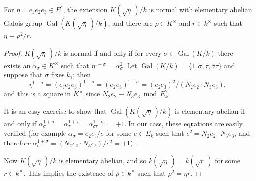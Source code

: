 \documentclass[10pt,a4paper]{amsart}
\newcommand{\Gal}{\operatorname{Gal}}
\begin{document}
\begin{lemma}\label{L2.9}
For $\eta = e_1e_2e_3 \in E^*$, the extension
$K(\sqrt{\eta}\,)/k$ is normal with elementary abelian
Galois group $\Gal(K(\sqrt{\eta}\,)/k)$, and there are
$\rho \in K^\times$ and $r \in k^\times$ such that
$\eta = \rho^2/r$.
\end{lemma}

\begin{proof}
$K(\sqrt{\eta}\,)/k$ is normal if and only if for every
$\sigma \in \Gal(K/k)$ there exists an $\alpha_\sigma \in K^\times$
such that $\eta^{1-\sigma} = \alpha_\sigma^2$. Let
$\Gal(K/k) = \{1,\sigma, \tau, \sigma\tau\}$ and suppose
that $\sigma$ fixes $k_1$; then
$$ \eta^{1-\sigma} = (e_1e_2e_3)^{1-\sigma}
   = (e_2e_3)^{1-\sigma} = (e_2e_3)^2/(N_2e_2 \cdot N_3e_3),$$
and this is a square in $K^\times$ since
$N_2e_2 \equiv N_3e_3 \bmod E_k^2$.

It is an easy exercise to show that $\Gal(K(\sqrt{\eta}\,)/k)$
is elementary abelian if and only if $\alpha_\sigma^{1+\sigma}
 = \alpha_\tau^{1+\tau} = \alpha_{\sigma\tau}^{1+\sigma\tau} = +1$.
In our case, these equations are easily verified (for example
$\alpha_\sigma = e_2e_3/e$ for some $e \in E_k$ such that
$e^2 = N_2e_2 \cdot N_3 e_3$, and therefore
$\alpha_\sigma^{1+\sigma} = (N_2e_2 \cdot N_3e_3)/e^2 = +1$).

Now $K(\sqrt{\eta}\,)/k$ is elementary abelian, and so
$k(\sqrt{\eta}\,) = k(\sqrt{r}\,)$ for some $r \in k^\times$.
This implies the existence of $\rho \in k^\times$ such that
$\rho^2 = \eta r$.
\end{proof}
\end{document}
